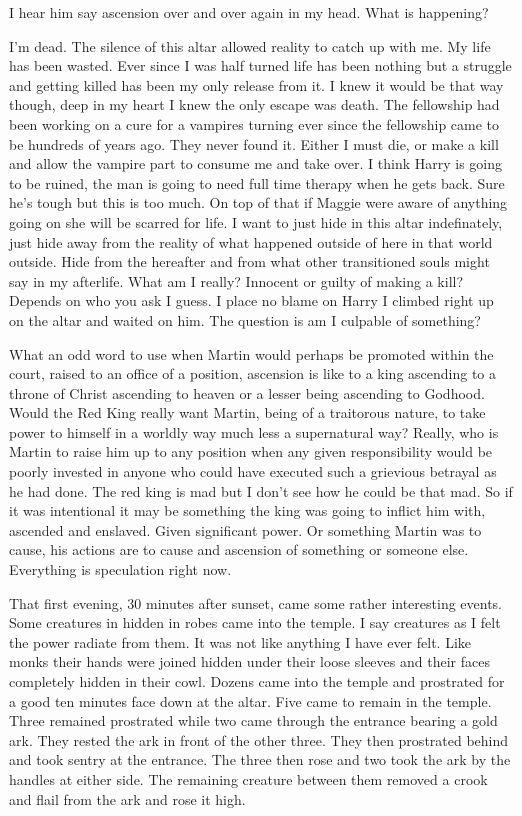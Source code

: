 I hear him say ascension over and over again in my head. What is happening? 


I'm dead. The silence of this altar allowed reality to catch up with me. My life has been wasted. Ever since I was half turned life has been nothing but a struggle and getting killed has been my only release from it. I knew it would be that way though, deep in my heart I knew the only escape was death. The fellowship had been working on a cure for a vampires turning ever since the fellowship came to be hundreds of years ago. They never found it. Either I must die, or make a kill and allow the vampire part to consume me and take over. I think Harry is going to be ruined, the man is going to need full time therapy when he gets back. Sure he's tough but this is too much. On top of that if Maggie were aware of anything going on she will be scarred for life. I want to just hide in this altar indefinately, just hide away from the reality of what happened outside of here in that world outside. Hide from the hereafter and from what other transitioned souls might say in my afterlife. What am I really? Innocent or guilty of making a kill? Depends on who you ask I guess. I place no blame on Harry I climbed right up on the altar and waited on him. The question is am I culpable of something?

What an odd word to use when Martin would perhaps be promoted within the court, raised to an office of a position, ascension is like to a king ascending to a throne of Christ ascending to heaven or a lesser being ascending to Godhood. Would the Red King really want Martin, being of a traitorous nature, to take power to himself in a worldly way much less a supernatural way? Really, who is Martin to raise him up to any position when any given responsibility would be poorly invested in anyone who could have executed such a grievious betrayal as he had done. The red king is mad but I don't see how he could be that mad. So if it was intentional it may be something the king was going to inflict him with, ascended and enslaved. Given significant power. Or something Martin was to cause, his actions are to cause and ascension of something or someone else. Everything is speculation right now.

That first evening, 30 minutes after sunset, came some rather interesting events. Some creatures in hidden in robes came into the temple. I say creatures as I felt the power radiate from them. It was not like anything I have ever felt. Like monks their hands were joined hidden under their loose sleeves and their faces completely hidden in their cowl. Dozens came into the temple and prostrated for a good ten minutes face down at the altar. Five came to remain in the temple. Three remained prostrated while two came through the entrance bearing a gold ark. They rested the ark in front of the other three. They then prostrated behind and took sentry at the entrance. The three then rose and two took the ark by the handles at either side. The remaining creature between them removed a crook and flail from the ark and rose it high. 

